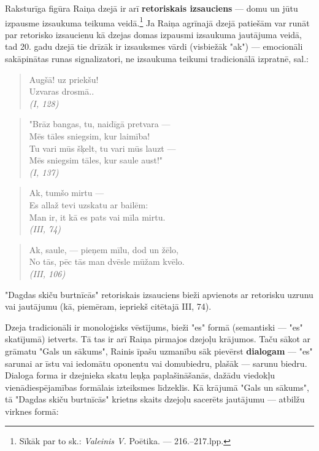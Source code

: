 \documentclass[11pt]{article}
\begin{document}
Raksturīga figūra Raiņa dzejā ir arī {\bf retoriskais
izsauciens} --- domu un jūtu izpausme
izsaukuma teikuma veidā.\footnote{Sīkāk par to
sk.: {\em Valeinis V.} Poētika. --- 216.--217.lpp.}
Ja Raiņa agrīnajā dzejā patiešām var runāt par retorisko
izsaucienu kā dzejas domas izpausmi izsaukuma
jautājuma veidā, tad 20. gadu dzejā tie drīzāk ir
izsauksmes vārdi (visbiežāk "ak") ---
emocionāli sakāpinātas runas signalizatori, ne izsaukuma
teikumi tradicionālā izpratnē, sal.:

\begin{quote}
Augšā! uz priekšu!\\
Uzvaras drosmā..\\
{\em (I, 128)}
\end{quote}

\begin{quote}
"Brāz bangas, tu, naidīgā pretvara ---\\
Mēs tāles sniegsim, kur laimība!\\
Tu vari mūs šķelt, tu vari mūs lauzt ---\\
Mēs sniegsim tāles, kur saule aust!"\\
{\em (I, 137)}
\end{quote}

\begin{quote}
Ak, tumšo mirtu ---\\
Es allaž tevi uzskatu ar bailēm:\\
Man ir, it kā es pats vai mīla mirtu.\\
{\em (III, 74)}
\end{quote}

\begin{quote}
Ak, saule, --- pieņem mīlu, dod un žēlo,\\
No tās, pēc tās man dvēsle mūžam kvēlo.\\
{\em (III, 106)}
\end{quote}

"Dagdas skiču burtnīcās" retoriskais izsauciens
bieži apvienots ar retorisku uzrunu vai jautājumu
(kā, piemēram, iepriekš citētajā III, 74).

Dzeja tradicionāli ir monoloģisks vēstījums,
bieži "es" formā (semantiski ---
"es" skatījumā) ietverts. Tā tas ir arī Raiņa pirmajos
dzejoļu krājumos. Taču sākot ar grāmatu "Gals un sākums",
Rainis īpašu uzmanību sāk pievērst {\bf dialogam} ---
"es" sarunai ar īstu vai iedomātu oponentu vai
domubiedru, plašāk --- sarunu biedru.
Dialoga forma ir dzejnieka skatu leņķa paplašināšanās,
dažādu viedokļu vienādiespējamības formālais izteiksmes
līdzeklis. Kā krājumā "Gals un sākums", tā
"Dagdas skiču burtnīcās" krietns skaits dzejoļu
sacerēts jautājumu --- atbilžu virknes formā:
\end{document}
